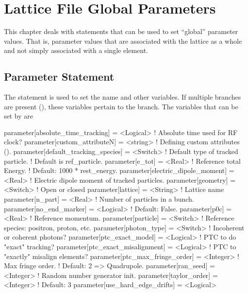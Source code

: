 \chapter{Lattice File Global Parameters}

This chapter deals with statements that can be used to set ``global''
parameter values. That is, parameter values that are associated with
the lattice as a whole and not simply associated with a single element.

\section{Parameter Statement}
\label{s:param}


The  statement is used to set the  name and
other variables. If multiple branches are present (), these
variables pertain to the  branch. The variables that can be
set by  are
\begin{example}
  parameter[absolute_time_tracking]   = <Logical>  ! Absolute time used for RF clock?
  parameter[custom_attributeN]        = <string>   ! Defining custom attributes ().
  parameter[default_tracking_species] = <Switch>   ! Default type of tracked particle. 
                                                   !    Default is ref_particle.
  parameter[e_tot]                    = <Real>     ! Reference total Energy. 
                                                   !      Default: 1000 * rest_energy.
  parameter[electric_dipole_moment]   = <Real>     ! Electric dipole moment of tracked particles.
  parameter[geometry]                 = <Switch>   ! Open or closed
  parameter[lattice]                  = <String>   ! Lattice name 
  parameter[n_part]                   = <Real>     ! Number of particles in a bunch.
  parameter[no_end_marker]            = <Logical>  ! Default: False.
  parameter[p0c]                      = <Real>     ! Reference momentum.
  parameter[particle]                 = <Switch>   ! Reference species: positron, proton, etc.
  parameter[photon_type]              = <Switch>   ! Incoherent or coherent photons?
  parameter[ptc_exact_model]          = <Logical>  ! PTC to do "exact" tracking?
  parameter[ptc_exact_misalignment]   = <Logical>  ! PTC to "exactly" misalign elements?
  parameter[ptc_max_fringe_order]     = <Integer>  ! Max fringe order. 
                                                   !    Default: 2 => Quadrupole.
  parameter[ran_seed]                 = <Integer>  ! Random number generator init.
  parameter[taylor_order]             = <Integer>  ! Default: 3
  parameter[use_hard_edge_drifts]     = <Logical>
\end{example}

